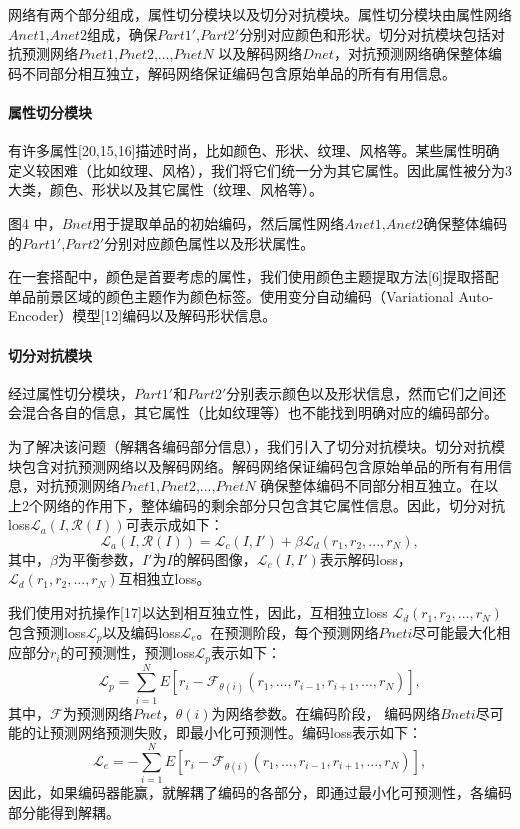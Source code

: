 网络有两个部分组成，属性切分模块以及切分对抗模块。属性切分模块由属性网络$Anet1$,$Anet2$组成，确保$Part 1'$,$Part 2'$分别对应颜色和形状。切分对抗模块包括对抗预测网络$Pnet 1$,$Pnet 2$,...,$Pnet N$ 以及解码网络$Dnet$，对抗预测网络确保整体编码不同部分相互独立，解码网络保证编码包含原始单品的所有有用信息。


\paragraph{属性切分模块}
有许多属性[20,15,16]描述时尚，比如颜色、形状、纹理、风格等。某些属性明确定义较困难（比如纹理、风格），我们将它们统一分为其它属性。因此属性被分为3大类，颜色、形状以及其它属性（纹理、风格等）。

图4 中，$Bnet$用于提取单品的初始编码，然后属性网络$Anet1$,$Anet2$确保整体编码的$Part 1'$,$Part 2'$分别对应颜色属性以及形状属性。

在一套搭配中，颜色是首要考虑的属性，我们使用颜色主题提取方法[6]提取搭配单品前景区域的颜色主题作为颜色标签。使用变分自动编码（Variational Auto-Encoder）模型[12]编码以及解码形状信息。

\paragraph{切分对抗模块}
经过属性切分模块，$Part 1'$和$Part 2'$分别表示颜色以及形状信息，然而它们之间还会混合各自的信息，其它属性（比如纹理等）也不能找到明确对应的编码部分。

为了解决该问题（解耦各编码部分信息），我们引入了切分对抗模块。切分对抗模块包含对抗预测网络以及解码网络。解码网络保证编码包含原始单品的所有有用信息，对抗预测网络$Pnet 1$,$Pnet 2$,...,$Pnet N$ 确保整体编码不同部分相互独立。在以上2个网络的作用下，整体编码的剩余部分只包含其它属性信息。因此，切分对抗loss$\mathcal{L}_{a}(I,\mathcal{R}(I))$可表示成如下：
\begin{equation}
\mathcal{L}_{a}(I,\mathcal{R}(I))= \mathcal{L}_{c}(I,I') + \beta\mathcal{L}_{d}(r_{1},r_{2},...,r_{N}),
\end{equation}
其中，$\beta$为平衡参数，$I'$为$I$的解码图像，$\mathcal{L}_{c}(I,I')$表示解码loss，$\mathcal{L}_{d}(r_{1},r_{2},...,r_{N})$互相独立loss。

我们使用对抗操作[17]以达到相互独立性，因此，互相独立loss $\mathcal{L}_{d}(r_{1},r_{2},...,r_{N})$ 包含预测loss$\mathcal{L}_{p}$以及编码loss$\mathcal{L}_{e}$。在预测阶段，每个预测网络$Pnet i$尽可能最大化相应部分$r_{i}$的可预测性，预测loss$\mathcal{L}_{p}$表示如下：
\begin{equation}
\mathcal{L}_{p}= \sum_{i=1}^{N}E[r_{i} - \mathcal{F}_{\theta(i)}(r_{1},...,r_{i-1},r_{i+1},...,r_{N})],
\end{equation}
其中，$\mathcal{F}$为预测网络$Pnet$，$\theta(i)$为网络参数。在编码阶段， 编码网络$Bnet i$尽可能的让预测网络预测失败，即最小化可预测性。编码loss表示如下：
\begin{equation}
\mathcal{L}_{e}= - \sum_{i=1}^{N}E[r_{i} - \mathcal{F}_{\theta(i)}(r_{1},...,r_{i-1},r_{i+1},...,r_{N})],
\end{equation}
因此，如果编码器能赢，就解耦了编码的各部分，即通过最小化可预测性，各编码部分能得到解耦。

